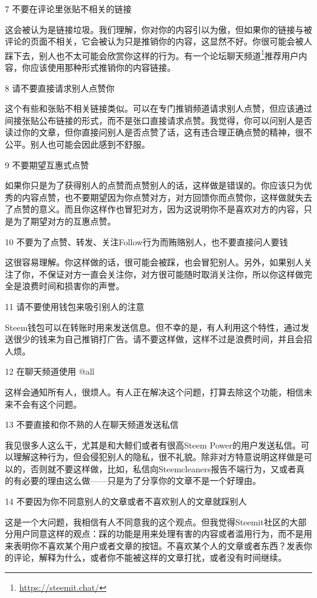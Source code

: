 \documentclass[]{ctexbook}
\renewcommand{\href}[2]{#2\footnote{\url{#1}}}
\begin{document}
7 不要在评论里张贴不相关的链接

这会被认为是链接垃圾。我们理解，你对你的内容引以为傲，但如果你的链接与被评论的页面不相关，它会被认为只是推销你的内容，这显然不好。你很可能会被人踩下去，别人也不太可能会欣赏你这样的行为。有一个\href{https://steemit.chat/}{论坛聊天频道}推荐用户内容，你应该使用那种形式推销你的内容链接。

8 请不要直接请求别人点赞你

这个有些和张贴不相关链接类似。可以在专门推销频道请求别人点赞，但应该通过间接张贴公布链接的形式，而不是张口直接请求点赞。我觉得，你可以问别人是否读过你的文章，但你直接问别人是否点赞了话，这有违合理正确点赞的精神，很不公平。别人也可能会因此感到不舒服。

9 不要期望互惠式点赞

如果你只是为了获得别人的点赞而点赞别人的话，这样做是错误的。你应该只为优秀的内容点赞，也不要期望因为你点赞对方，对方回馈你而点赞你，这样做就失去了点赞的意义。而且你这样作也冒犯对方，因为这说明你不是喜欢对方的内容，只是为了期望对方的互惠点赞。

10 不要为了点赞、转发、关注Follow行为而贿赂别人，也不要直接问人要钱

这很容易理解。你这样做的话，很可能会被踩，也会冒犯别人。另外，如果别人关注了你，不保证对方一直会关注你，对方很可能随时取消关注你，所以你这样做完全是浪费时间和损害你的声誉。

11 请不要使用钱包来吸引别人的注意

Steem钱包可以在转账时用来发送信息。但不幸的是，有人利用这个特性，通过发送很少的钱来为自己推销打广告。请不要这样做，这样不过是浪费时间，并且会招人烦。

12 在聊天频道使用 @all

这样会通知所有人，很烦人。有人正在解决这个问题，打算去除这个功能，相信未来不会有这个问题。

13 不要直接和你不熟的人在聊天频道发送私信

我见很多人这么干，尤其是和大鲸们或者有很高Steem Power的用户发送私信。可以理解这种行为，但会侵犯别人的隐私，很不礼貌。除非对方特意说明这样做是可以的，否则就不要这样做，比如，私信向Steemcleaners报告不端行为，又或者真的有必要的理由这么做------只是为了分享你的文章不是一个好理由。

14 不要因为你不同意别人的文章或者不喜欢别人的文章就踩别人

这是一个大问题，我相信有人不同意我的这个观点。但我觉得Steemit社区的大部分用户同意这样的观点：踩的功能是用来处理有害的内容或者滥用行为，而不是用来表明你不喜欢某个用户或者文章的按钮。不喜欢某个人的文章或者东西？发表你的评论，解释为什么，或者你不能被这样的文章打扰，或者没有时间继续。
\end{document}
